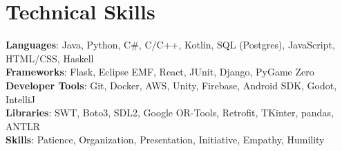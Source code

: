 \documentclass[letterpaper,11pt]{article}
\begin{document}
%
\section{Technical Skills}
 \begin{itemize}[leftmargin=0.15in, label={}]
    \small{\item{
     \textbf{Languages}{: Java, Python, C\#, C/C++, Kotlin, SQL (Postgres), JavaScript, HTML/CSS, Haskell} \\
     \textbf{Frameworks}{: Flask, Eclipse EMF, React, JUnit, Django, PyGame Zero} \\
     \textbf{Developer Tools}{: Git, Docker, AWS, Unity, Firebase, Android SDK, Godot, IntelliJ} \\
     \textbf{Libraries}{: SWT, Boto3, SDL2, Google OR-Tools, Retrofit, TKinter, pandas, ANTLR} \\
     \textbf{Skills}{: Patience, Organization, Presentation, Initiative, Empathy, Humility}
    }}
 \end{itemize}


\end{document}
